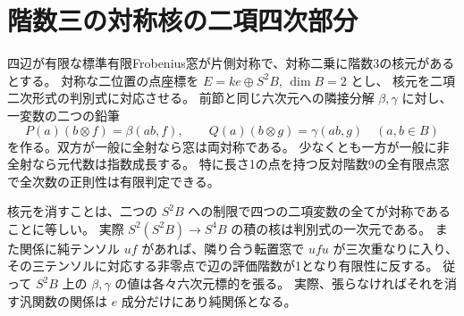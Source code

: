 \section{階数三の対称核の二項四次部分}
\label{sec:cone-kernel-binary-transfer}
\begin{theorem}\label{thm:cone-kernel-binary-transfer}
四辺が有限な標準有限Frobenius窓が片側対称で、対称二乗に階数3の核元があるとする。
対称な二位置の点座標を $E=k e\oplus S^2 B$, $\dim B=2$ とし、
核元を二項二次形式の判別式に対応させる。
前節と同じ六次元への隣接分解 $\beta,\gamma$ に対し、一変数の二つの鉛筆
\[
 P(a)(b\otimes f)=\beta(ab,f),\qquad Q(a)(b\otimes g)=\gamma(ab,g)
 \quad(a,b\in B)
\]
を作る。双方が一般に全射なら窓は両対称である。
少なくとも一方が一般に非全射なら元代数は指数成長する。
特に長さ1の点を持つ反対階数9の全有限点窓で全次数の正則性は有限判定できる。
\end{theorem}
核元を消すことは、二つの $S^2 B$ への制限で四つの二項変数の全てが対称であることに等しい。
実際 $S^2(S^2 B)\to S^4 B$ の積の核は判別式の一次元である。
また関係に純テンソル $u f$ があれば、隣り合う転置窓で $u f u$ が三次重なりに入り、
その三テンソルに対応する非零点で辺の評価階数が1となり有限性に反する。
従って $S^2 B$ 上の $\beta,\gamma$ の値は各々六次元標的を張る。
実際、張らなければそれを消す汎関数の関係は $e$ 成分だけにあり純関係となる。


